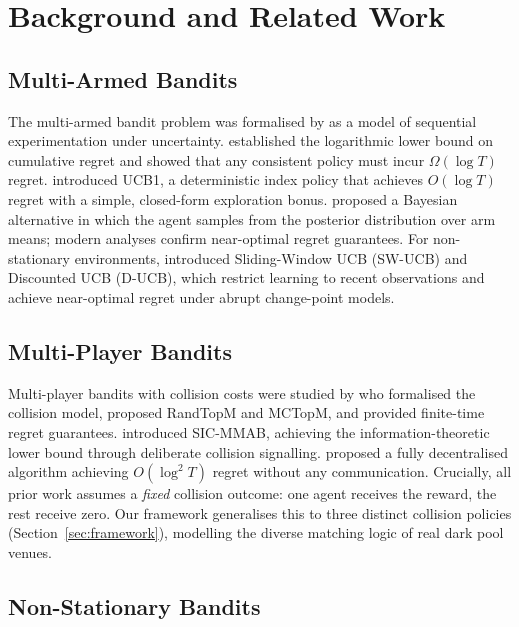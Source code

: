 \documentclass[11pt]{article}
\begin{document}
\section{Background and Related Work}
\label{sec:background}

\subsection{Multi-Armed Bandits}

The multi-armed bandit problem was formalised by \citet{robbins1952} as a
model of sequential experimentation under uncertainty.
\citet{lai1985} established the logarithmic lower bound on cumulative
regret and showed that any consistent policy must incur $\Omega(\log T)$
regret.
\citet{auer2002} introduced UCB1, a deterministic index policy that
achieves $O(\log T)$ regret with a simple, closed-form exploration bonus.
\citet{thompson1933} proposed a Bayesian alternative in which the agent
samples from the posterior distribution over arm means; modern analyses
\citep{bubeck2012} confirm near-optimal regret guarantees.
For non-stationary environments, \citet{garivier2011} introduced
Sliding-Window UCB (SW-UCB) and Discounted UCB (D-UCB), which restrict
learning to recent observations and achieve near-optimal regret under
abrupt change-point models.

\subsection{Multi-Player Bandits}

Multi-player bandits with collision costs were studied by
\citet{besson2018} who formalised the collision model, proposed RandTopM
and MCTopM, and provided finite-time regret guarantees.
\citet{boursier2019} introduced SIC-MMAB, achieving the information-theoretic
lower bound through deliberate collision signalling.
\citet{bistritz2018} proposed a fully decentralised algorithm achieving
$O(\log^2 T)$ regret without any communication.
Crucially, all prior work assumes a \emph{fixed} collision outcome: one
agent receives the reward, the rest receive zero.
Our framework generalises this to three distinct collision policies
(Section~\ref{sec:framework}), modelling the diverse matching logic of
real dark pool venues.

\subsection{Non-Stationary Bandits}
\end{document}
